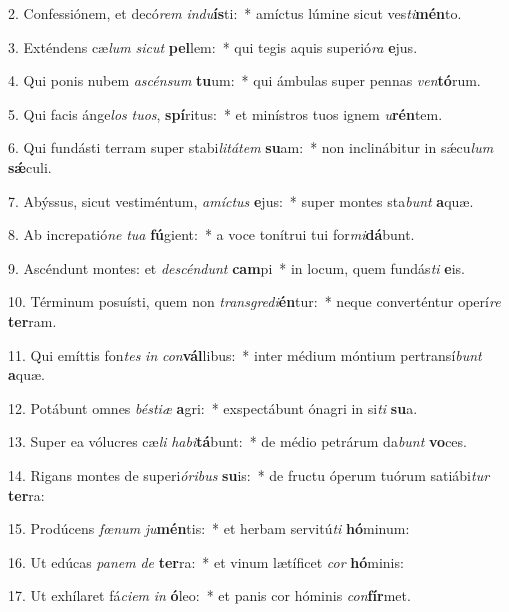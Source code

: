 2. Confessiónem, et decó\textit{rem} \textit{ind}\textit{u}\textbf{ís}ti:~*  amíctus lúmine sicut ves\textit{ti}\textbf{mén}to.\

3. Exténdens cæ\textit{lum} \textit{sic}\textit{ut} \textbf{pel}lem:~*  qui tegis aquis superió\textit{ra} \textbf{e}jus.\

4. Qui ponis nubem \textit{a}\textit{scén}\textit{sum} \textbf{tu}um:~*  qui ámbulas super pennas \textit{ven}\textbf{tó}rum.\

5. Qui facis ánge\textit{los} \textit{tu}\textit{os}, \textbf{spí}ritus:~*  et minístros tuos ignem \textit{u}\textbf{rén}tem.\

6. Qui fundásti terram super stabi\textit{li}\textit{tá}\textit{tem} \textbf{su}am:~*  non inclinábitur in sǽcu\textit{lum} \textbf{sǽ}culi.\

7. Abýssus, sicut vestiméntum, \textit{a}\textit{míc}\textit{tus} \textbf{e}jus:~*  super montes sta\textit{bunt} \textbf{a}quæ.\

8. Ab increpatió\textit{ne} \textit{tu}\textit{a} \textbf{fú}gient:~*  a voce tonítrui tui for\textit{mi}\textbf{dá}bunt.\

9. Ascéndunt montes: et \textit{de}\textit{scén}\textit{dunt} \textbf{cam}pi~*  in locum, quem fundás\textit{ti} \textbf{e}is.\

10. Términum posuísti, quem non \textit{trans}\textit{gre}\textit{di}\textbf{én}tur:~*  neque converténtur operí\textit{re} \textbf{ter}ram.\

11. Qui emíttis fon\textit{tes} \textit{in} \textit{con}\textbf{vál}libus:~*  inter médium móntium pertransí\textit{bunt} \textbf{a}quæ.\

12. Potábunt omnes \textit{bés}\textit{ti}\textit{æ} \textbf{a}gri:~*  exspectábunt ónagri in si\textit{ti} \textbf{su}a.\

13. Super ea vólucres cæ\textit{li} \textit{ha}\textit{bi}\textbf{tá}bunt:~*  de médio petrárum da\textit{bunt} \textbf{vo}ces.\

14. Rigans montes de superi\textit{ó}\textit{ri}\textit{bus} \textbf{su}is:~*  de fructu óperum tuórum satiábi\textit{tur} \textbf{ter}ra:\

15. Prodúcens \textit{fœ}\textit{num} \textit{ju}\textbf{mén}tis:~*  et herbam servitú\textit{ti} \textbf{hó}minum:\

16. Ut edúcas \textit{pa}\textit{nem} \textit{de} \textbf{ter}ra:~*  et vinum lætíficet \textit{cor} \textbf{hó}minis:\

17. Ut exhílaret fá\textit{ci}\textit{em} \textit{in} \textbf{ó}leo:~*  et panis cor hóminis \textit{con}\textbf{fír}met.\

